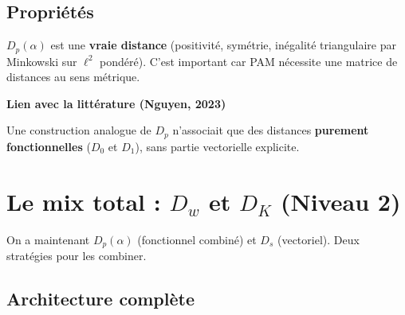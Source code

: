 \documentclass[11pt, a4paper]{article}
\newcommand{\Dp}{D_p}
\newcommand{\Dw}{D_w}
\newcommand{\DK}{D_K}
\newenvironment{keybox}[1][]{%
  \def\FrameCommand{\fboxsep=8pt \fcolorbox{emphborder}{emphbox}}%
  \MakeFramed{\advance\hsize-\width \FrameRestore}%
  \noindent\textbf{#1}\par\smallskip\noindent\ignorespaces
}{\endMakeFramed}
\begin{document}
\subsection{Propriétés}

$\Dp(\alpha)$ est une \textbf{vraie distance} (positivité, symétrie,
inégalité triangulaire par Minkowski sur $\ell^2$ pondéré). C'est important
car PAM nécessite une matrice de distances au sens métrique.

\begin{keybox}[Lien avec la littérature (Nguyen, 2023)]
Une construction analogue de $\Dp$ n'associait que des distances
\textbf{purement fonctionnelles} ($D_0$ et $D_1$), sans partie vectorielle
explicite.
\end{keybox}

\newpage
\section{Le mix total : $\Dw$ et $\DK$ (Niveau 2)}

On a maintenant $\Dp(\alpha)$ (fonctionnel combiné) et $D_s$ (vectoriel).
Deux stratégies pour les combiner.

\subsection{Architecture complète}
\end{document}
